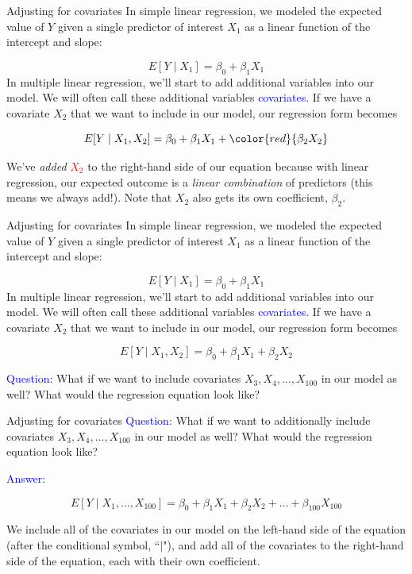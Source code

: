 \documentclass[10pt,t]{beamer}
\begin{document}
\begin{frame}{Adjusting for covariates}
In simple linear regression, we modeled the expected value of $Y$ given a single predictor of interest $X_1$ as a linear function of the intercept and slope:

$$
E[Y \mid X_1] = \beta_0 + \beta_1 X_1
$$
In multiple linear regression, we'll start to add additional variables into our model. We will often call these additional variables \textcolor{blue}{covariates}. If we have a covariate $X_2$ that we want to include in our model, our regression form becomes

$$
E[Y \mid X_1, X_2] = \beta_0 + \beta_1 X_1 + \color{red}{\beta_2 X_2}
$$

We've \textit{added} \textcolor{red}{$X_2$} to the right-hand side of our equation because with linear regression, our expected outcome is a \textit{linear combination} of predictors (this means we always add!). Note that $X_2$ also gets its own coefficient, $\beta_2$.

\end{frame}

\begin{frame}{Adjusting for covariates}
In simple linear regression, we modeled the expected value of $Y$ given a single predictor of interest $X_1$ as a linear function of the intercept and slope:

$$
E[Y \mid X_1] = \beta_0 + \beta_1 X_1
$$
In multiple linear regression, we'll start to add additional variables into our model. We will often call these additional variables \textcolor{blue}{covariates}. If we have a covariate $X_2$ that we want to include in our model, our regression form becomes

$$
E[Y \mid X_1, X_2] = \beta_0 + \beta_1 X_1 + \beta_2 X_2
$$

\textcolor{blue}{Question}: What if we want to include covariates $X_3, X_4, \dots, X_{100}$ in our model as well? What would the regression equation look like?
\end{frame}

\begin{frame}{Adjusting for covariates}
\textcolor{blue}{Question}: What if we want to additionally include covariates $X_3, X_4, \dots, X_{100}$ in our model as well? What would the regression equation look like?

\vspace{0.3cm}

\textcolor{blue}{Answer:} 

$$
E[Y \mid X_1, \dots, X_{100}] = \beta_0 + \beta_1 X_1 + \beta_2 X_2 + \dots + \beta_{100} X_{100}
$$

We include all of the covariates in our model on the left-hand side of the equation (after the conditional symbol, ``$|$"), and add all of the covariates to the right-hand side of the equation, each with their own coefficient.

\end{frame}
\end{document}

